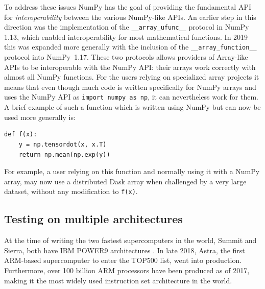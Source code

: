\documentclass[fleqn,10pt]{wlscirep}
\newcommand{\code}[1]{\texttt{#1}}
\begin{document}
To address these issues NumPy has the goal of providing the fundamental
API for \emph{interoperability} between the various NumPy-like APIs.
An earlier step in this direction was the implementation of the
\code{\_\_array\_ufunc\_\_} protocol in NumPy 1.13, which enabled interoperability
for most mathematical functions.\cite{NEP13}
In 2019 this was expanded more generally with the inclusion of the
\code{\_\_array\_function\_\_} protocol into NumPy~1.17.
These two protocols allows providers of Array-like APIs to be interoperable
with the NumPy API: their arrays work correctly with almost all NumPy functions.\cite{NEP18}
For the users relying on specialized array projects it means that even though
much code is written specifically for NumPy arrays and uses the NumPy API as
\code{import numpy as np}, it can nevertheless work for them.
A brief example of such a function which is written using NumPy
but can now be used more generally is:
\begin{lstlisting}
def f(x):
    y = np.tensordot(x, x.T)
    return np.mean(np.exp(y))
\end{lstlisting}
For example, a user relying on this function and normally using it with a
NumPy array, may now use a distributed Dask array when challenged
by a very large dataset, without any modification to \code{f(x)}.

%
%


\subsection*{Testing on multiple architectures}

At the time of writing the two fastest supercomputers in the
world, Summit and Sierra, both have IBM POWER9 architectures
\cite{top500nov2019}. In late 2018, Astra, the first ARM-based
supercomputer to enter the TOP500 list, went into production\cite{
astra-wiki}. Furthermore, over 100 billion ARM processors have been
produced as of 2017\cite{arm-architecture}, making it the most 
widely used instruction set architecture in the world.
\end{document}
